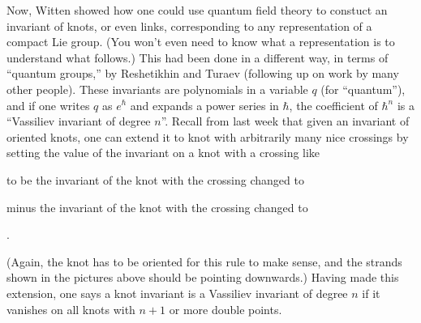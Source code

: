 Now, Witten showed how one could use quantum field theory to constuct an
invariant of knots, or even links, corresponding to any representation
of a compact Lie group.  (You won't even need to know what a
representation is to understand what follows.)  This had been done in a
different way, in terms of ``quantum groups,'' by Reshetikhin and Turaev
(following up on work by many other people).  These invariants are
polynomials in a variable $q$ (for ``quantum''), and if one writes $q$ as
$e^\hbar$ and expands a power series in $\hbar$, the coefficient of $\hbar^n$ is
a ``Vassiliev invariant of degree $n$''.  Recall from last week that
given an invariant of oriented knots, one can extend
it to knot with arbitrarily many nice crossings by setting
the value of the invariant on a knot with a crossing like

\begin{center}
\end{center}
to be the invariant of the knot with the crossing changed to
\begin{center}
\end{center}
minus the invariant of the knot with the crossing changed to
\begin{center}
.
\end{center}
(Again, the knot has to be oriented for this rule to make sense,
and the strands shown in the pictures above should be pointing
downwards.)   Having made this extension, one says a knot
invariant is a Vassiliev invariant of degree $n$ if it vanishes
on all knots with $n+1$ or more double points.

